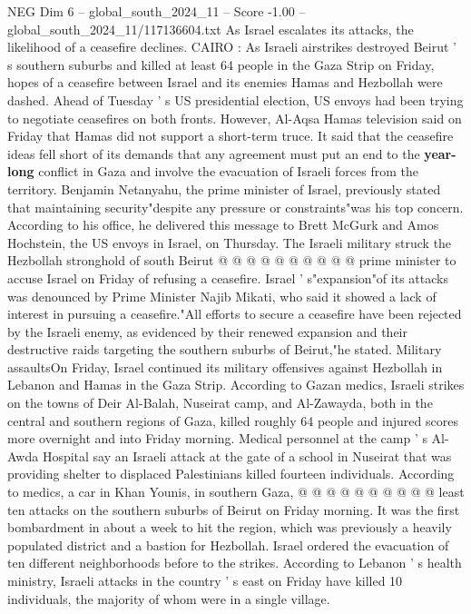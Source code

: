 \begin{textsample}{NEG Dim 6 – global\_south\_2024\_11 – Score -1.00 – global\_south\_2024\_11/117136604.txt}  \label{ex:f6_neg_107}
As Israel escalates its attacks, the likelihood of a ceasefire declines.
CAIRO : As Israeli airstrikes destroyed Beirut ' s southern suburbs and killed at least 64 people in the Gaza Strip on Friday, hopes of a ceasefire between Israel and its enemies Hamas and Hezbollah were dashed.
Ahead of Tuesday ' s US presidential election, US envoys had been trying to negotiate ceasefires on both fronts.
However, Al-Aqsa Hamas television said on Friday that Hamas did not support a short-term truce.
It said that the ceasefire ideas fell short of its demands that any agreement must put an end to the \textbf{year-long} conflict in Gaza and involve the evacuation of Israeli forces from the territory.
Benjamin Netanyahu, the prime minister of Israel, previously stated that maintaining security"despite any pressure or constraints"was his top concern.
According to his office, he delivered this message to Brett McGurk and Amos Hochstein, the US envoys in Israel, on Thursday.
The Israeli military struck the Hezbollah stronghold of south Beirut @ @ @ @ @ @ @ @ @ @ prime minister to accuse Israel on Friday of refusing a ceasefire.
Israel ' s"expansion"of its attacks was denounced by Prime Minister Najib Mikati, who said it showed a lack of interest in pursuing a ceasefire."All efforts to secure a ceasefire have been rejected by the Israeli enemy, as evidenced by their renewed expansion and their destructive raids targeting the southern suburbs of Beirut,"he stated.
Military assaultsOn Friday, Israel continued its military offensives against Hezbollah in Lebanon and Hamas in the Gaza Strip.
According to Gazan medics, Israeli strikes on the towns of Deir Al-Balah, Nuseirat camp, and Al-Zawayda, both in the central and southern regions of Gaza, killed roughly 64 people and injured scores more overnight and into Friday morning.
Medical personnel at the camp ' s Al-Awda Hospital say an Israeli attack at the gate of a school in Nuseirat that was providing shelter to displaced Palestinians killed fourteen individuals.
According to medics, a car in Khan Younis, in southern Gaza, @ @ @ @ @ @ @ @ @ @ least ten attacks on the southern suburbs of Beirut on Friday morning.
It was the first bombardment in about a week to hit the region, which was previously a heavily populated district and a bastion for Hezbollah.
Israel ordered the evacuation of ten different neighborhoods before to the strikes.
According to Lebanon ' s health ministry, Israeli attacks in the country ' s east on Friday have killed 10 individuals, the majority of whom were in a single village.

\end{textsample}
